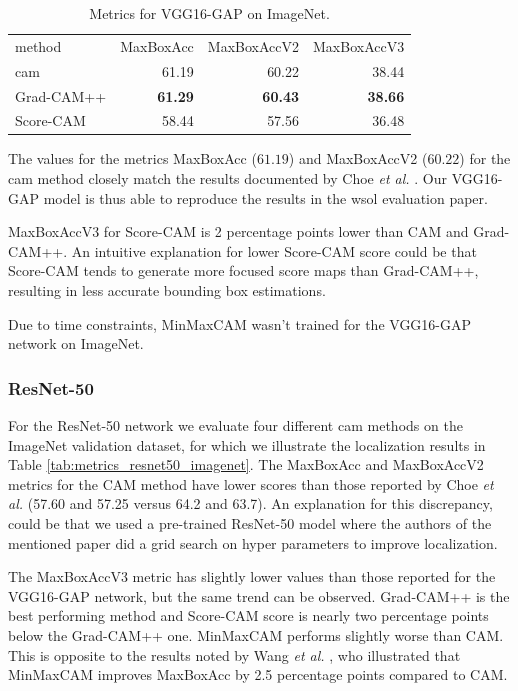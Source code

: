 \begin{table}[ht]
\centering
\begin{tabular}{lrrr}
\toprule
method & MaxBoxAcc & MaxBoxAccV2 & MaxBoxAccV3 \\
\cmidrule(lr){1-1} \cmidrule(lr){2-4}
cam & 61.19 & 60.22 & 38.44 \\
Grad-CAM++ & \bfseries 61.29 & \bfseries 60.43 & \bfseries 38.66 \\
Score-CAM & 58.44 & 57.56 & 36.48 \\
\bottomrule
\end{tabular}
\caption[Metrics for VGG16-GAP on ImageNet]{Metrics for VGG16-GAP on ImageNet.}
\label{tab:metrics_vgg16_gap_imagenet}
\end{table}

The values for the metrics MaxBoxAcc ($61.19$) and MaxBoxAccV2 ($60.22$) for the \acrshort{cam} method closely match the results documented by Choe \textit{et al.} \cite{choe2020evaluating}. Our VGG16-GAP model is thus able to reproduce the results in the \acrshort{wsol} evaluation paper.

MaxBoxAccV3 for Score-CAM is 2 percentage points lower than CAM and Grad-CAM++. An intuitive explanation for lower Score-CAM score could be that Score-CAM tends to generate more focused score maps than Grad-CAM++, resulting in less accurate bounding box estimations. 

Due to time constraints, MinMaxCAM wasn't trained for the VGG16-GAP network on ImageNet.

\subsubsection{ResNet-50}

For the ResNet-50 network we evaluate four different \acrshort{cam} methods on the ImageNet validation dataset, for which we illustrate the localization results in Table \ref{tab:metrics_resnet50_imagenet}. The MaxBoxAcc and MaxBoxAccV2 metrics for the CAM method have lower scores than those reported by Choe \textit{et al.} (57.60 and 57.25 versus 64.2 and 63.7). An explanation for this discrepancy, could be that we used a pre-trained ResNet-50 model where the authors of the mentioned paper did a grid search on hyper parameters to improve localization. 

The MaxBoxAccV3 metric has slightly lower values than those reported for the VGG16-GAP network, but the same trend can be observed. Grad-CAM++ is the best performing method and Score-CAM score is nearly two percentage points below the Grad-CAM++ one. MinMaxCAM performs slightly worse than CAM. This is opposite to the results noted by Wang \textit{et al.} \cite{wang2021minmaxcam}, who illustrated that MinMaxCAM improves MaxBoxAcc by 2.5 percentage points compared to CAM. 


